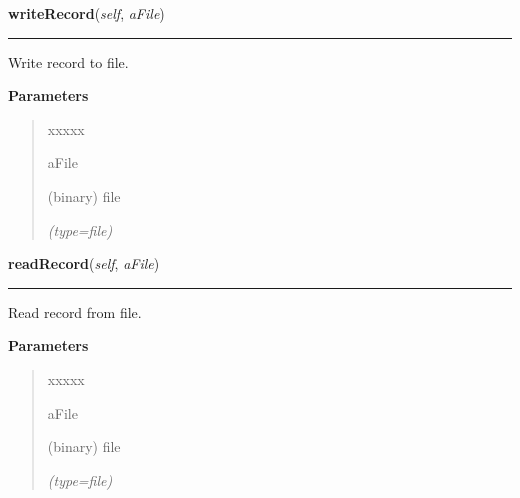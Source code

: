 \hspace{.8\funcindent}\begin{boxedminipage}{\funcwidth}

    \raggedright \textbf{writeRecord}(\textit{self}, \textit{aFile})

    \vspace{-1.5ex}

    \rule{\textwidth}{0.5\fboxrule}
\setlength{\parskip}{2ex}
    Write record to file.

\setlength{\parskip}{1ex}
      \textbf{Parameters}
      \vspace{-1ex}

      \begin{quote}
        \begin{Ventry}{xxxxx}

          \item[aFile]

          (binary) file

            {\it (type=file)}

        \end{Ventry}

      \end{quote}

    \end{boxedminipage}

    \label{mille:MilleRecord:readRecord}

    \vspace{0.5ex}

\hspace{.8\funcindent}\begin{boxedminipage}{\funcwidth}

    \raggedright \textbf{readRecord}(\textit{self}, \textit{aFile})

    \vspace{-1.5ex}

    \rule{\textwidth}{0.5\fboxrule}
\setlength{\parskip}{2ex}
    Read record from file.

\setlength{\parskip}{1ex}
      \textbf{Parameters}
      \vspace{-1ex}

      \begin{quote}
        \begin{Ventry}{xxxxx}

          \item[aFile]

          (binary) file

            {\it (type=file)}

        \end{Ventry}

      \end{quote}

    \end{boxedminipage}

